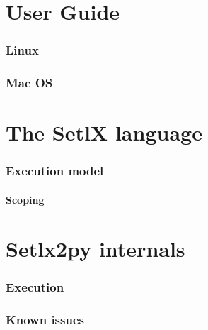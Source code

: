 \documentclass[a4paper,11pt]{article}
\begin{document}



\tableofcontents
\clearpage
\listoftables
\listoffigures
\printglossaries


\clearpage
\part{User Guide}




\section{Linux}

\section{Mac OS}

\clearpage
\part{The SetlX language}
\clearpage


\section{Execution model}
\subsection{Scoping}


\clearpage
\part{Setlx2py internals}
\clearpage








\section{Execution}

\section{Known issues}
\end{document}
